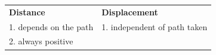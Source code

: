 {    %
    
        \begin{center}
      
      \label{m38788*id63941}
      
    \noindent
      \tablelasttail{}
      \begin{xtabular*}{\mytablewidth}[t]{|p{10\mystarwidth}|p{10\mystarwidth}|}\hline
    
    
        
                  \textbf{ Distance }
                 &
    
    
        
                  \textbf{ Displacement }
     \tabularnewline{}
    
    
        1. depends on the path &
    
    
        1. independent of path taken%
     \tabularnewline{}
    
    
        2. always positive &
    

\end{xtabular*}
\end{center}}

